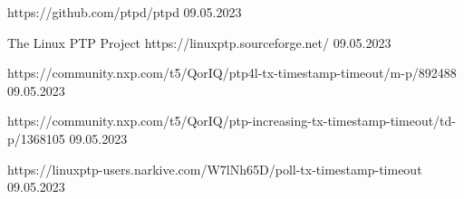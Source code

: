 {\begin{thebibliography}{9}
        {}
        {https://github.com/ptpd/ptpd}
        {09.05.2023}
        
        {The Linux PTP Project}
        {https://linuxptp.sourceforge.net/}
        {09.05.2023}
        
        {}
        {https://community.nxp.com/t5/QorIQ/ptp4l-tx-timestamp-timeout/m-p/892488}
        {09.05.2023}
        
        {}
        {https://community.nxp.com/t5/QorIQ/ptp-increasing-tx-timestamp-timeout/td-p/1368105}
        {09.05.2023}

        {}
        {https://linuxptp-users.narkive.com/W7lNh65D/poll-tx-timestamp-timeout}
        {09.05.2023}

    \end{thebibliography}
}

